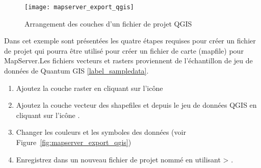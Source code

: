 \begin{figure}[ht]
\centering
  \texttt{[image: mapserver\_export\_qgis]}
   \caption{Arrangement des couches d'un fichier de projet QGIS \nixcaption}
  \label{fig:mapserver_export_qgs}
\end{figure}
Dans cet exemple sont présentées les quatre étapes requises pour créer un fichier de projet qui pourra être utilisé pour créer un fichier de carte (mapfile) pour MapServer.Les fichiers vecteurs et rasters proviennent de l'échantillon de jeu de données de Quantum GIS \ref{label_sampledata}.


\begin{enumerate}
\item Ajoutez la couche raster  en cliquant sur l'icône\\ 
\item Ajoutez la couche vecteur des shapefiles  et  depuis le jeu de données QGIS en cliquant sur l'icône .
\item Changer les couleurs et les symboles des données (voir Figure~\ref{fig:mapserver_export_qgis})
\item Enregistrez dans un nouveau fichier de projet nommé  en utilisant  > .
\end{enumerate} 

